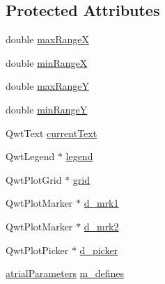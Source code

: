 \subsection*{Protected Attributes}
\begin{DoxyCompactItemize}
\item 
double \hyperlink{class_default_plot_ad9c7fefd2b2beac187116c6c274e226b}{max\+Range\+X}
\item 
double \hyperlink{class_default_plot_a5fb55a0fc4fb764c9ab100ef8bed151a}{min\+Range\+X}
\item 
double \hyperlink{class_default_plot_a0a9fd99e0ffac64fbbe8e2c7d599699d}{max\+Range\+Y}
\item 
double \hyperlink{class_default_plot_a6430390e18d83bcd55212e7a56af7cb3}{min\+Range\+Y}
\item 
Qwt\+Text \hyperlink{class_default_plot_aecabd8aa4a721d21e1e01dcc41c621ea}{current\+Text}
\item 
Qwt\+Legend $\ast$ \hyperlink{class_default_plot_a599dcc2f358a4d1f7500a00018b4ba9d}{legend}
\item 
Qwt\+Plot\+Grid $\ast$ \hyperlink{class_default_plot_a7bf0ea1a18ef87f69aaab57589629da4}{grid}
\item 
Qwt\+Plot\+Marker $\ast$ \hyperlink{class_default_plot_ada5a5d4e6f0996d79b0a4ba353f12726}{d\+\_\+mrk1}
\item 
Qwt\+Plot\+Marker $\ast$ \hyperlink{class_default_plot_a8021357960017f7338d48981e32b8ae4}{d\+\_\+mrk2}
\item 
Qwt\+Plot\+Picker $\ast$ \hyperlink{class_default_plot_afc5eba9a9ff1a5fa825fd34dc5637b68}{d\+\_\+picker}
\item 
\hyperlink{classatrial_parameters}{atrial\+Parameters} \hyperlink{class_default_plot_a2c81cca14d02f5c3802f462f84ba2864}{m\+\_\+defines}
\end{DoxyCompactItemize}


